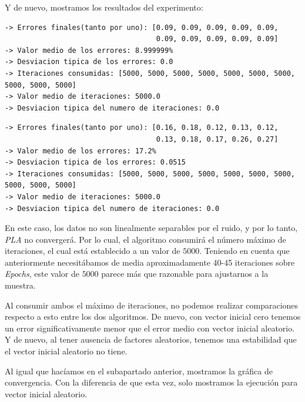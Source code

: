 \documentclass[11pt]{article}
\begin{document}
Y de nuevo, mostramos los resultados del experimento:

\begin{lstlisting}[caption={Resultados para vector inicial cero y ruido en las etiquetas}, captionpos=b]
-> Errores finales(tanto por uno): [0.09, 0.09, 0.09, 0.09, 0.09,
                                    0.09, 0.09, 0.09, 0.09, 0.09]
-> Valor medio de los errores: 8.999999%
-> Desviacion tipica de los errores: 0.0
-> Iteraciones consumidas: [5000, 5000, 5000, 5000, 5000, 5000, 5000, 5000, 5000, 5000]
-> Valor medio de iteraciones: 5000.0
-> Desviacion tipica del numero de iteraciones: 0.0
\end{lstlisting}

\begin{lstlisting}[caption={Resultados para vector inicial aleatorio y ruido en las etiquetas}, captionpos=b]
-> Errores finales(tanto por uno): [0.16, 0.18, 0.12, 0.13, 0.12,
                                    0.13, 0.18, 0.17, 0.26, 0.27]
-> Valor medio de los errores: 17.2%
-> Desviacion tipica de los errores: 0.0515
-> Iteraciones consumidas: [5000, 5000, 5000, 5000, 5000, 5000, 5000, 5000, 5000, 5000]
-> Valor medio de iteraciones: 5000.0
-> Desviacion tipica del numero de iteraciones: 0.0
\end{lstlisting}

En este caso, los datos no son linealmente separables por el ruido, y por lo tanto, \emph{PLA} no convergerá. Por lo cual, el algoritmo consumirá el número máximo de iteraciones, el cual está establecido a un valor de $5000$. Teniendo en cuenta que anteriormente necesitábamos de media aproximadamente 40-45 iteraciones sobre \emph{Epochs}, este valor de $5000$ parece más que razonable para ajustarnos a la muestra.

Al consumir ambos el máximo de iteraciones, no podemos realizar comparaciones respecto a esto entre los dos algoritmos. De nuevo, con vector inicial cero tenemos un error significativamente menor que el error medio con vector inicial aleatorio. Y de nuevo, al tener ausencia de factores aleatorios, tenemos una estabilidad que el vector inicial aleatorio no tiene.

Al igual que hacíamos en el subapartado anterior, mostramos la gráfica de convergencia. Con la diferencia de que esta vez, solo mostramos la ejecución para vector inicial aleatorio.
\end{document}
